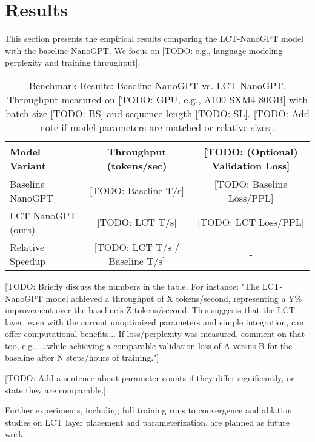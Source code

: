 \section{Results}
\label{sec:results}
This section presents the empirical results comparing the LCT-NanoGPT model with the baseline NanoGPT. We focus on [TODO: e.g., language modeling perplexity and training throughput].

\begin{table}[h!]
  \centering
  \caption{Benchmark Results: Baseline NanoGPT vs. \textsc{LCT}-NanoGPT. Throughput measured on [TODO: GPU, e.g., A100 SXM4 80GB] with batch size [TODO: BS] and sequence length [TODO: SL]. [TODO: Add note if model parameters are matched or relative sizes].}
  \label{tab:results}
  \begin{tabular}{lcc}
    \toprule
    Model Variant & Throughput (tokens/sec) & [TODO: (Optional) Validation Loss] \\
    \midrule
    Baseline NanoGPT    & [TODO: Baseline T/s] & [TODO: Baseline Loss/PPL] \\
    \textsc{LCT}-NanoGPT (ours) & [TODO: LCT T/s]      & [TODO: LCT Loss/PPL] \\
    \midrule
    Relative Speedup    & [TODO: LCT T/s / Baseline T/s] & - \\
    \bottomrule
  \end{tabular}
\end{table}

[TODO: Briefly discuss the numbers in the table. For instance: "The \textsc{LCT}-NanoGPT model achieved a throughput of X tokens/second, representing a Y\% improvement over the baseline's Z tokens/second. This suggests that the LCT layer, even with the current unoptimized parameters and simple integration, can offer computational benefits... If loss/perplexity was measured, comment on that too, e.g., ...while achieving a comparable validation loss of A versus B for the baseline after N steps/hours of training."]

[TODO: Add a sentence about parameter counts if they differ significantly, or state they are comparable.]

Further experiments, including full training runs to convergence and ablation studies on LCT layer placement and parameterization, are planned as future work.

